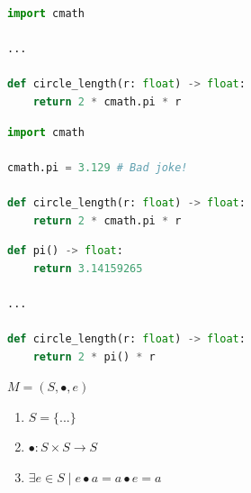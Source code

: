 \documentclass[aspectratio=169]{beamer}
\begin{document}
\begin{frame}[fragile,t]
    \begin{lstlisting}[language=Python]
import cmath

...

def circle_length(r: float) -> float:
    return 2 * cmath.pi * r
    \end{lstlisting}
\end{frame}

\begin{frame}[fragile,t]
    \begin{lstlisting}[language=Python]
import cmath

cmath.pi = 3.129 # Bad joke!

def circle_length(r: float) -> float:
    return 2 * cmath.pi * r
    \end{lstlisting}
\end{frame}

\begin{frame}[fragile,t]
    \begin{lstlisting}[language=Python]
def pi() -> float:
    return 3.14159265

...

def circle_length(r: float) -> float:
    return 2 * pi() * r
    \end{lstlisting}
\end{frame}

\begin{frame}
    \centering
\end{frame}

\begin{frame}
    \centering
        \Huge
            $M = (S, \bullet, e)$
\end{frame}

\begin{frame}
    \Huge
        \begin{enumerate}[ leftmargin=1.5em
                         , itemsep=1em
                         , labelsep=0.5em
                         , label=\color{darkelectricblue}\Roman*
                         ]
            \item $S = \{...\}$
            \item $\bullet : S \times S \to S$
            \item $\exists e \in S \mid e \bullet a = a \bullet e = a$
        \end{enumerate}
\end{frame}
\end{document}
